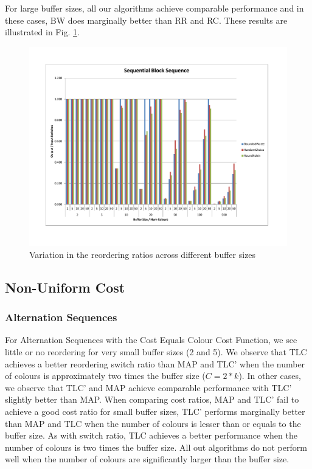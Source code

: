 For large buffer sizes, all our algorithms achieve comparable performance and in these cases, BW does marginally better than RR and RC. These results are illustrated in Fig. \ref{sequentialBlockUniform}.

\begin{figure}[ht]
\centering 
\includegraphics[scale=0.60]{Sequential-Block-Uniform.pdf}
\caption{Variation in the reordering ratios across different buffer sizes}
\label{sequentialBlockUniform}
\end{figure}

\subsection{Non-Uniform Cost}

\subsubsection{Alternation Sequences}

For Alternation Sequences with the Cost Equals Colour Cost Function, we see little or no reordering for very small buffer sizes (2 and 5). We observe that TLC achieves a better reordering switch ratio than MAP and TLC' when the number of colours is approximately two times the buffer size ($C = 2 * k$). In other cases, we observe that TLC' and MAP achieve comparable performance with TLC' slightly better than MAP. When comparing cost ratios, MAP and TLC' fail to achieve a good cost ratio for small buffer sizes, TLC' performs marginally better than MAP and TLC when the number of colours is lesser than or equals to the buffer size. As with switch ratio, TLC achieves a better performance when the number of colours is two times the buffer size. All out algorithms do not perform well when the number of colours are significantly larger than the buffer size. 

